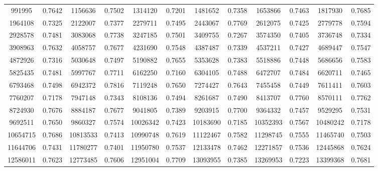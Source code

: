 \documentclass[12pt]{article}
\begin{document}
\begin{longtable}{@{}
        S[table-format=8.0] c
        S[table-format=8.0] c
        S[table-format=8.0] c
        S[table-format=8.0] c
        S[table-format=8.0] c
        S[table-format=8.0] c @{}}
        \num{991995}&0.7642  & \num{1156636}&0.7502  & \num{1314120}&0.7201  &
        \num{1481652}&0.7358  & \num{1653866}&0.7463  & \num{1817930}&0.7685  \\
        \num{1964108}&0.7325  & \num{2122007}&0.7377  & \num{2279711}&0.7495  &
        \num{2443067}&0.7769  & \num{2612075}&0.7425  & \num{2779778}&0.7594  \\
        \num{2928578}&0.7481  & \num{3083068}&0.7738  & \num{3247185}&0.7501  &
        \num{3409755}&0.7267  & \num{3574350}&0.7405  & \num{3736748}&0.7334  \\
        \num{3908963}&0.7632  & \num{4058757}&0.7677  & \num{4231690}&0.7548  &
        \num{4387487}&0.7339  & \num{4537211}&0.7427  & \num{4689447}&0.7547  \\
        \num{4872926}&0.7316  & \num{5030648}&0.7497  & \num{5190882}&0.7655  &
        \num{5353628}&0.7383  & \num{5518886}&0.7448  & \num{5686656}&0.7583  \\
        \num{5825435}&0.7481  & \num{5997767}&0.7711  & \num{6162250}&0.7160  &
        \num{6304105}&0.7488  & \num{6472707}&0.7484  & \num{6620711}&0.7465  \\
        \num{6793468}&0.7498  & \num{6942372}&0.7816  & \num{7119248}&0.7650  &
        \num{7274427}&0.7643  & \num{7455458}&0.7449  & \num{7611411}&0.7603  \\
        \num{7760207}&0.7178  & \num{7947148}&0.7343  & \num{8108136}&0.7494  &
        \num{8261687}&0.7490  & \num{8413707}&0.7760  & \num{8570111}&0.7762  \\
        \num{8724930}&0.7676  & \num{8884187}&0.7677  & \num{9041805}&0.7389  &
        \num{9203915}&0.7700  & \num{9364332}&0.7457  & \num{9529295}&0.7531  \\
        \num{9692511}&0.7650  & \num{9860327}&0.7574  & \num{10026342}&0.7423 &
        \num{10183690}&0.7185 & \num{10352393}&0.7567 & \num{10480242}&0.7178 \\
        \num{10654715}&0.7686 & \num{10813533}&0.7413 & \num{10990748}&0.7619 &
        \num{11122467}&0.7582 & \num{11298745}&0.7555 & \num{11465740}&0.7503 \\
        \num{11644706}&0.7431 & \num{11780277}&0.7401 & \num{11950780}&0.7537 &
        \num{12133478}&0.7462 & \num{12271857}&0.7536 & \num{12445868}&0.7624 \\
        \num{12586011}&0.7623 & \num{12773485}&0.7606 & \num{12951004}&0.7709 &
        \num{13093955}&0.7385 & \num{13269953}&0.7223 & \num{13399368}&0.7681 \\

\end{longtable}
\end{document}
